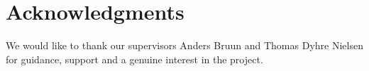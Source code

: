 
\section{Acknowledgments}
We would like to thank our supervisors Anders Bruun and Thomas Dyhre Nielsen for guidance, support and a genuine interest in the project.